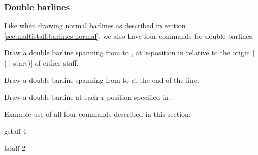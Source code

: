 \subsubsection{Double barlines}\label{sec:multistaff:barlines:double}
Like when drawing normal barlines as described in section 
\ref{sec:multistaff:barlines:normal}, 
we also have four commands for double barlines.
\begin{command}{\tmdoublebarline{}}
  Draw a double barline spanning from  to 
  , at $x$-position  in relative to 
  the origin |(||-start)| of either staff.
\end{command}
\begin{command}{\tmdoublebarlineendline{}}
  Draw a double barline spanning from  to 
   at the end of the line.
\end{command}
\begin{command}{\tmdoublebarlineinline{}}
  Draw a double barline at each $x$-position specified in .
\end{command}
Example use of all four commands described in this section:
\begin{codeexample}[]
\begin{tmline}%
\begin{tmstaff}{g}{staff-1}\end{tmstaff}%
\begin{tmstaff}{f}{staff-2}
\end{tmstaff}%
%
%
%
%
\end{tmline}
\end{codeexample}
